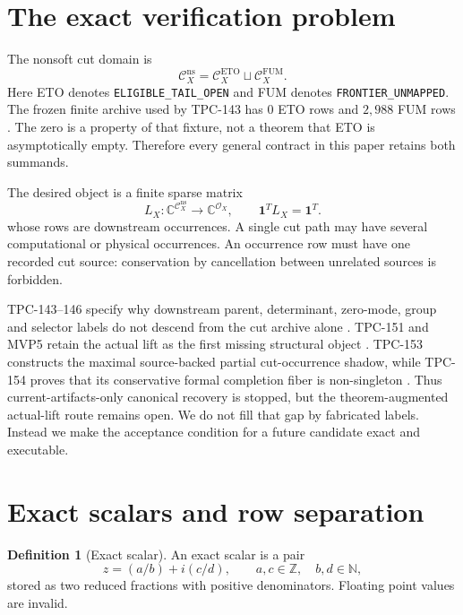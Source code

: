 \documentclass[11pt]{article}
\numberwithin{equation}{section}
\theoremstyle{definition}
\newtheorem{definition}[theorem]{Definition}
\theoremstyle{remark}
\newcommand{\ETO}{\mathcal C_X^{\mathrm{ETO}}}
\newcommand{\FUM}{\mathcal C_X^{\mathrm{FUM}}}
\newcommand{\Cns}{\mathcal C_X^{\mathrm{ns}}}
\newcommand{\Oh}{\mathcal O_X}
\newcommand{\one}{\mathbf 1}
\begin{document}
\section{The exact verification problem}

The nonsoft cut domain is
\[
 \Cns=\ETO\sqcup\FUM.
\]
Here ETO denotes \texttt{ELIGIBLE\_TAIL\_OPEN} and FUM denotes
\texttt{FRONTIER\_UNMAPPED}.  The frozen finite archive used by
TPC-143 has \(0\) ETO rows and \(2{,}988\) FUM rows
\citep{WangTPC143}.  The zero is a property of that fixture, not a
theorem that ETO is asymptotically empty.  Therefore every general
contract in this paper retains both summands.

The desired object is a finite sparse matrix
\begin{equation}
 L_X:\mathbb C^{\Cns}\longrightarrow\mathbb C^{\Oh},
 \qquad \one^T L_X=\one^T.
\end{equation}
whose rows are downstream occurrences.  A single cut path may have
several computational or physical occurrences.  An occurrence row
must have one recorded cut source: conservation by cancellation
between unrelated sources is forbidden.

TPC-143--146 specify why downstream parent, determinant, zero-mode,
group and selector labels do not descend from the cut archive alone
\citep{WangTPC143,WangTPC144,WangTPC145,WangTPC146}.  TPC-151 and
MVP5 retain the actual lift as the first missing structural object
\citep{WangTPC151,WangTPC152}.  TPC-153 constructs the maximal
source-backed partial cut-occurrence shadow, while TPC-154 proves that
its conservative formal completion fiber is non-singleton
\citep{WangTPC153,WangTPC154}.  Thus current-artifacts-only canonical
recovery is stopped, but the theorem-augmented actual-lift route
remains open.  We do not fill that gap by fabricated labels.  Instead
we make the acceptance condition for a future candidate exact and
executable.

\section{Exact scalars and row separation}

\begin{definition}[Exact scalar]
An exact scalar is a pair
\[
 z=(a/b)+i(c/d),\qquad a,c\in\mathbb Z,\quad b,d\in\mathbb N,
\]
stored as two reduced fractions with positive denominators.  Floating
point values are invalid.
\end{definition}
\end{document}
